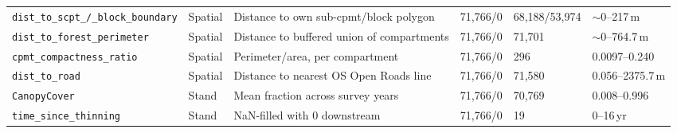 {\begin{longtable}{p{2.3cm}p{1.6cm}p{3.0cm}p{1.3cm}p{1.1cm}p{2.3cm}}
\texttt{dist\_to\_scpt\_/\_block\_boundary} & Spatial & Distance to own sub-cpmt/block polygon & 71{,}766/0 & 68{,}188/53{,}974 & $\sim$0--217\,m \\
\texttt{dist\_to\_forest\_perimeter} & Spatial & Distance to buffered union of compartments & 71{,}766/0 & 71{,}701 & $\sim$0--764.7\,m \\
\texttt{cpmt\_compactness\_ratio} & Spatial & Perimeter/area, per compartment & 71{,}766/0 & 296 & 0.0097--0.240 \\
\texttt{dist\_to\_road} & Spatial & Distance to nearest OS Open Roads line & 71{,}766/0 & 71{,}580 & 0.056--2375.7\,m \\
\texttt{CanopyCover} & Stand & Mean fraction across survey years & 71{,}766/0 & 70{,}769 & 0.008--0.996 \\
\texttt{time\_since\_thinning} & Stand & NaN-filled with 0 downstream & 71{,}766/0 & 19 & 0--16\,yr \\
\end{longtable}
}


